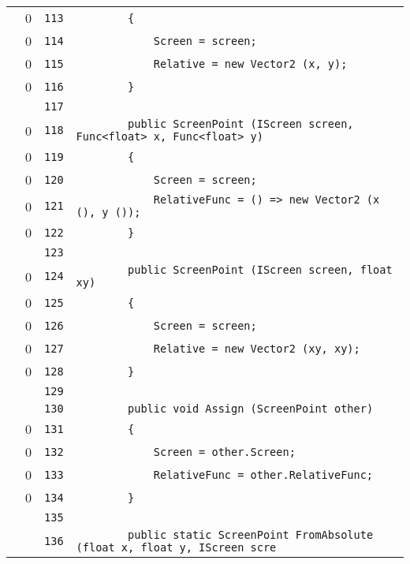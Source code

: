 \documentclass[a4paper,10pt]{article}
\begin{document}
\begin{longtable}[l]{lrrl}
\cellcolor{red} & 0 & \verb~113~ & \verb~        {~\\
\cellcolor{red} & 0 & \verb~114~ & \verb~            Screen = screen;~\\
\cellcolor{red} & 0 & \verb~115~ & \verb~            Relative = new Vector2 (x, y);~\\
\cellcolor{red} & 0 & \verb~116~ & \verb~        }~\\
\cellcolor{gray} &  & \verb~117~ & \verb~~\\
\cellcolor{red} & 0 & \verb~118~ & \verb~        public ScreenPoint (IScreen screen, Func<float> x, Func<float> y)~\\
\cellcolor{red} & 0 & \verb~119~ & \verb~        {~\\
\cellcolor{red} & 0 & \verb~120~ & \verb~            Screen = screen;~\\
\cellcolor{red} & 0 & \verb~121~ & \verb~            RelativeFunc = () => new Vector2 (x (), y ());~\\
\cellcolor{red} & 0 & \verb~122~ & \verb~        }~\\
\cellcolor{gray} &  & \verb~123~ & \verb~~\\
\cellcolor{red} & 0 & \verb~124~ & \verb~        public ScreenPoint (IScreen screen, float xy)~\\
\cellcolor{red} & 0 & \verb~125~ & \verb~        {~\\
\cellcolor{red} & 0 & \verb~126~ & \verb~            Screen = screen;~\\
\cellcolor{red} & 0 & \verb~127~ & \verb~            Relative = new Vector2 (xy, xy);~\\
\cellcolor{red} & 0 & \verb~128~ & \verb~        }~\\
\cellcolor{gray} &  & \verb~129~ & \verb~~\\
\cellcolor{gray} &  & \verb~130~ & \verb~        public void Assign (ScreenPoint other)~\\
\cellcolor{red} & 0 & \verb~131~ & \verb~        {~\\
\cellcolor{red} & 0 & \verb~132~ & \verb~            Screen = other.Screen;~\\
\cellcolor{red} & 0 & \verb~133~ & \verb~            RelativeFunc = other.RelativeFunc;~\\
\cellcolor{red} & 0 & \verb~134~ & \verb~        }~\\
\cellcolor{gray} &  & \verb~135~ & \verb~~\\
\cellcolor{gray} &  & \verb~136~ & \verb~        public static ScreenPoint FromAbsolute (float x, float y, IScreen scre~\\

\end{longtable}
\end{document}
